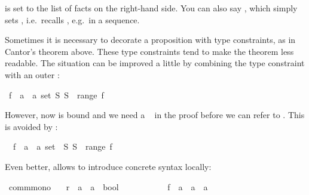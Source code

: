 \begin{isabellebody}
\begin{isamarkuptext}
 is set to the list of facts on the right-hand side. You
can also say , which simply sets ,
i.e.\ recalls , e.g.\ in a  sequence.%
\end{isamarkuptext}%
\isamarkuptrue%
%
\isamarkuptrue%
%
\begin{isamarkuptext}%
Sometimes it is necessary to decorate a proposition with type
constraints, as in Cantor's theorem above. These type constraints tend
to make the theorem less readable. The situation can be improved a
little by combining the type constraint with an outer \isa{{\isasymAnd}}:%
\end{isamarkuptext}%
\isamarkuptrue%
\ {\isachardoublequote}{\isasymAnd}f\ {\isacharcolon}{\isacharcolon}\ {\isacharprime}a\ {\isasymRightarrow}\ {\isacharprime}a\ set{\isachardot}\ {\isasymexists}S{\isachardot}\ S\ {\isasymnotin}\ range\ f{\isachardoublequote}\isamarkupfalse%
\isamarkupfalse%
%
\begin{isamarkuptext}%
\noindent However, now  is bound and we need a
~ in the proof before we can refer to .
This is avoided by :%
\end{isamarkuptext}%
\isamarkuptrue%
\ \ f\ {\isacharcolon}{\isacharcolon}\ {\isachardoublequote}{\isacharprime}a\ {\isasymRightarrow}\ {\isacharprime}a\ set{\isachardoublequote}\ \ {\isachardoublequote}{\isasymexists}S{\isachardot}\ S\ {\isasymnotin}\ range\ f{\isachardoublequote}\isamarkupfalse%
\isamarkupfalse%
%
\begin{isamarkuptext}%
\noindent
Even better,  allows to introduce concrete syntax locally:%
\end{isamarkuptext}%
\isamarkuptrue%
\ comm{\isacharunderscore}mono{\isacharcolon}\isanewline
\ \ \ r\ {\isacharcolon}{\isacharcolon}\ {\isachardoublequote}{\isacharprime}a\ {\isasymRightarrow}\ {\isacharprime}a\ {\isasymRightarrow}\ bool{\isachardoublequote}\ {\isacharparenleft}\ {\isachardoublequote}{\isachargreater}{\isachardoublequote}\ {}{}{\isacharparenright}\ \isanewline
\ \ \ \ \ \ \ f\ {\isacharcolon}{\isacharcolon}\ {\isachardoublequote}{\isacharprime}a\ {\isasymRightarrow}\ {\isacharprime}a\ {\isasymRightarrow}\ {\isacharprime}a{\isachardoublequote}\ \ \ {\isacharparenleft}\ {\isachardoublequote}{\isacharplus}{\isacharplus}{\isachardoublequote}\ {}{}{\isacharparenright}\isanewline

\end{isabellebody}
